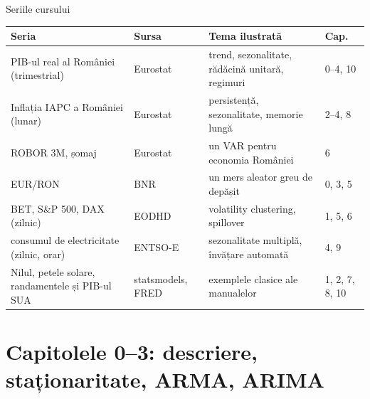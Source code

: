 \begin{frame}{Seriile cursului}
\itemsize{\small}
\begin{center}
\footnotesize
\begin{tabular}{>{\raggedright\arraybackslash}p{3.6cm}>{\raggedright\arraybackslash}p{2.6cm}>{\raggedright\arraybackslash}p{4.2cm}l}
\toprule
\textbf{Seria} & \textbf{Sursa} & \textbf{Tema ilustrată} & \textbf{Cap.} \\
\midrule
PIB-ul real al României (trimestrial) & Eurostat & trend, sezonalitate, rădăcină unitară, regimuri & 0--4, 10 \\
Inflația IAPC a României (lunar) & Eurostat & persistență, sezonalitate, memorie lungă & 2--4, 8 \\
ROBOR 3M, șomaj & Eurostat & un VAR pentru economia României & 6 \\
EUR/RON & BNR & un mers aleator greu de depășit & 0, 3, 5 \\
BET, S\&P 500, DAX (zilnic) & EODHD & volatility clustering, spillover & 1, 5, 6 \\
consumul de electricitate (zilnic, orar) & ENTSO-E & sezonalitate multiplă, învățare automată & 4, 9 \\
Nilul, petele solare, randamentele și PIB-ul SUA & statsmodels, FRED & exemplele clasice ale manualelor & 1, 2, 7, 8, 10 \\
\bottomrule
\end{tabular}
\end{center}
\end{frame}


\section{Capitolele 0--3: descriere, staționaritate, ARMA, ARIMA}

